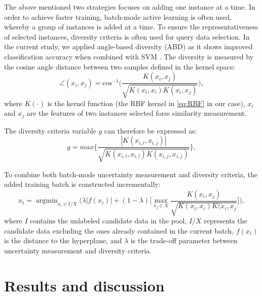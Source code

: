 The above mentioned two strategies focuses on adding one instance at a time. In order to achieve faster training, batch-mode active learning is often used, whereby a group of instances is added at a time. To ensure the representativeness of selected instances,  diversity criteria is often used for query data selection. In the current study, we applied angle-based diversity (ABD) as it shows improved classification accuracy when combined with SVM \cite{brinker2003incorporating, demir2011batch}. 
The diversity is measured by the cosine angle distance between two samples defined in the kernel space:
\begin{equation}
\angle (x_{i},  x_j) = \text{cos}^{-1} \big(   \frac{K(x_i, x_j)}   {\sqrt{K(x_i, x_i) K(x_i, x_j)}  } \big),
\label{eq:ABD_angle}
\end{equation}
where $K(\cdot)$ is the kernel function (the RBF kernel in \eqref{eq:RBF} in our case), $x_i$  and $x_j$ are the features of two instances selected forss similarity measurement.

The diversity criteria variable $g$ can therefore be expressed as:
\begin{equation}
g = max \{ \frac{|K(x_{i,l}, x_{i,j})|}{\sqrt{ K(x_{i,l}, x_{i,l}) K(x_{i,j}, x_{i,j})   }} \},
\label{eq:ABD_criteria}
\end{equation}


To combine both batch-mode uncertainty measurement and diversity criteria, the added training batch is constructed incrementally: 
\begin{equation}
\label{eq:combined_AL}  
    x_t = \mathop{\arg\min}_{x_{i}\in I/X}  \Big( \lambda |f(x_i)| + (1 - \lambda) \big[ \max_{x_{j} \in X}  \frac{K(x_i, x_j)}   {\sqrt{K(x_i, x_i) K(x_i, x_j}  }\big] \Big),
\end{equation} 
 where $I$ contains the unlabeled candidate data in the pool, $I/X$ represents the candidate data excluding the ones already contained in the current batch, $f(x_i)$ is the distance to the hyperplane, and $\lambda$ is the trade-off parameter between uncertainty measurement and diversity criteria. 
 

\section{Results and discussion}
\label{chap2:sec:results_and_discussion}

